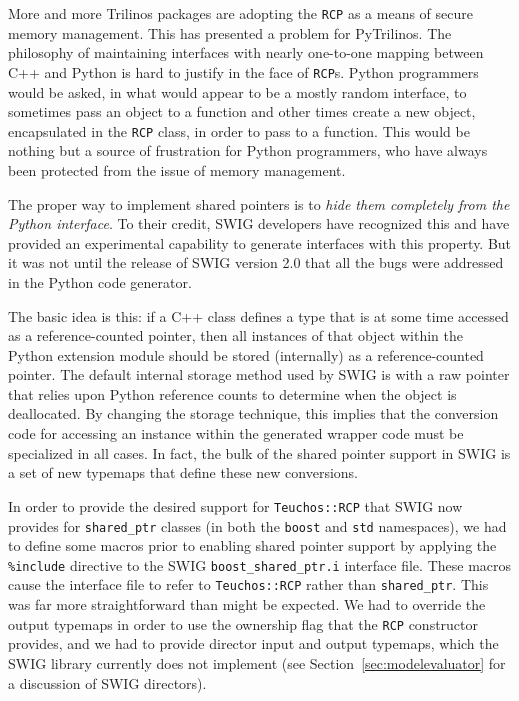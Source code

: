 \documentclass[11pt]{article}
\begin{document}
More and more Trilinos packages are adopting the {\tt RCP} as a means of secure memory management.  This has presented a problem for PyTrilinos.  The philosophy of maintaining interfaces with nearly one-to-one mapping between C++ and Python is hard to justify in the face of {\tt RCP}s.  Python programmers would be asked, in what would appear to be a mostly random interface, to sometimes pass an object to a function and other times create a new object, encapsulated in the {\tt RCP} class, in order to pass to a function.  This would be nothing but a source of frustration for Python programmers, who have always been protected from the issue of memory management.

The proper way to implement shared pointers is to {\em hide them completely from the Python interface}.  To their credit, SWIG developers have recognized this and have provided an experimental capability to generate interfaces with this property.  But it was not until the release of SWIG version 2.0 that all the bugs were addressed in the Python code generator.

The basic idea is this: if a C++ class defines a type that is at some time accessed as a reference-counted pointer, then all instances of that object within the Python extension module should be stored (internally) as a reference-counted pointer.  The default internal storage method used by SWIG is with a raw pointer that relies upon Python reference counts to determine when the object is deallocated.  By changing the storage technique, this implies that the conversion code for accessing an instance within the generated wrapper code must be specialized in all cases.  In fact, the bulk of the shared pointer support in SWIG is a set of new typemaps that define these new conversions.

In order to provide the desired support for {\tt Teuchos::RCP} that SWIG now provides for {\tt shared\_ptr} classes (in both the {\tt boost} and {\tt std} namespaces), we had to define some macros prior to enabling shared pointer support by applying the {\tt \%include} directive to the SWIG {\tt boost\_shared\_ptr.i} interface file. These macros cause the interface file to refer to {\tt Teuchos::RCP} rather than {\tt shared\_ptr}.  This was far more straightforward than might be expected.  We had to override the output typemaps in order to use the ownership flag that the {\tt RCP} constructor provides, and we had to provide director input and output typemaps, which the SWIG library currently does not implement (see Section~\ref{sec:modelevaluator} for a discussion of SWIG directors).
\end{document}

